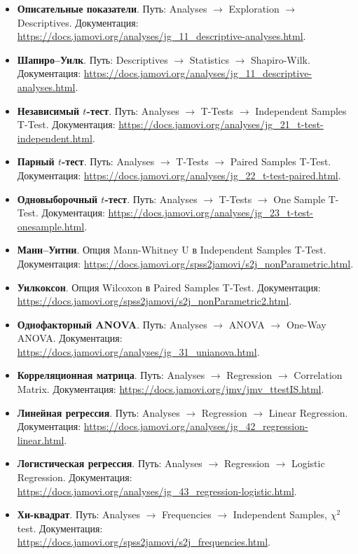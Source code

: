 \documentclass[11pt,a4paper]{article}
\begin{document}
\begin{tcolorbox}[title={Карта критериев в Jamovi}]
\begin{itemize}\tiny
\item \textbf{Описательные показатели}. Путь: Analyses $\to$ Exploration $\to$ Descriptives. Документация: \url{https://docs.jamovi.org/analyses/jg_11_descriptive-analyses.html}.
\item \textbf{Шапиро--Уилк}. Путь: Descriptives $\to$ Statistics $\to$ Shapiro-Wilk. Документация: \url{https://docs.jamovi.org/analyses/jg_11_descriptive-analyses.html}.
\item \textbf{Независимый $t$-тест}. Путь: Analyses $\to$ T-Tests $\to$ Independent Samples T-Test. Документация: \url{https://docs.jamovi.org/analyses/jg_21_t-test-independent.html}.
\item \textbf{Парный $t$-тест}. Путь: Analyses $\to$ T-Tests $\to$ Paired Samples T-Test. Документация: \url{https://docs.jamovi.org/analyses/jg_22_t-test-paired.html}.
\item \textbf{Одновыборочный $t$-тест}. Путь: Analyses $\to$ T-Tests $\to$ One Sample T-Test. Документация: \url{https://docs.jamovi.org/analyses/jg_23_t-test-onesample.html}.
\item \textbf{Манн--Уитни}. Опция Mann-Whitney U в Independent Samples T-Test. Документация: \url{https://docs.jamovi.org/spss2jamovi/s2j_nonParametric.html}.
\item \textbf{Уилкоксон}. Опция Wilcoxon в Paired Samples T-Test. Документация: \url{https://docs.jamovi.org/spss2jamovi/s2j_nonParametric2.html}.
\item \textbf{Однофакторный ANOVA}. Путь: Analyses $\to$ ANOVA $\to$ One-Way ANOVA. Документация: \url{https://docs.jamovi.org/analyses/jg_31_unianova.html}.
\item \textbf{Корреляционная матрица}. Путь: Analyses $\to$ Regression $\to$ Correlation Matrix. Документация: \url{https://docs.jamovi.org/jmv/jmv_ttestIS.html}.
\item \textbf{Линейная регрессия}. Путь: Analyses $\to$ Regression $\to$ Linear Regression. Документация: \url{https://docs.jamovi.org/analyses/jg_42_regression-linear.html}.
\item \textbf{Логистическая регрессия}. Путь: Analyses $\to$ Regression $\to$ Logistic Regression. Документация: \url{https://docs.jamovi.org/analyses/jg_43_regression-logistic.html}.
\item \textbf{Хи-квадрат}. Путь: Analyses $\to$ Frequencies $\to$ Independent Samples, $\chi^2$ test. Документация: \url{https://docs.jamovi.org/spss2jamovi/s2j_frequencies.html}.

\end{itemize}
\end{tcolorbox}
\end{document}
